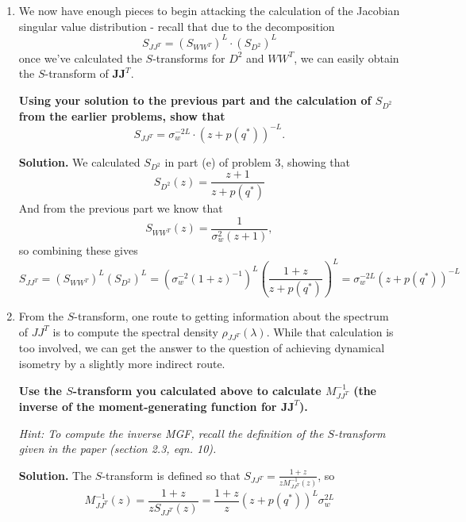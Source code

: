 \documentclass[a4paper]{article}
\begin{document}
\begin{enumerate}[label=(\alph*)]
    \item We now have enough pieces to begin attacking the calculation of the Jacobian singular value distribution - recall that due to the decomposition
    $$ S_{JJ^T} = (S_{WW^T})^L \cdot (S_{D^2})^L $$
    once we've calculated the $S$-transforms for $D^2$ and $WW^T$, we can easily obtain the $S$-transform of $\mathbf{J} \mathbf{J}^T$.
    
    \textbf{Using your solution to the previous part and the calculation of $S_{D^2}$ from the earlier problems, show that}
    $$ S_{JJ^T} = \sigma_w^{-2L} \cdot (z + p(q^*))^{-L} .$$
    
    \begin{tcolorbox}
    \textbf{Solution.}
    We calculated $S_{D^2}$ in part (e) of problem 3, showing that 
    $$S_{D^2}(z) = \frac{z+1}{z+ p(q^*)}$$
    And from the previous part we know that 
    $$S_{WW^T}(z) = \frac{1}{\sigma_w^2(z+1)},$$
    so combining these gives
    $$ S_{JJ^T} = (S_{WW^T})^L (S_{D^2})^L = \left( \sigma_w^{-2} (1 + z)^{-1} \right)^L \left( \frac{1 + z}{z + p(q^*)} \right)^L = \sigma_w^{-2L} (z + p(q^*))^{-L} $$
    \end{tcolorbox}
    
    \item From the $S$-transform, one route to getting information about the spectrum of $JJ^T$ is to compute the spectral density $\rho_{JJ^T}(\lambda)$. While that calculation is too involved, we can get the answer to the question of achieving dynamical isometry by a slightly more indirect route.  
    
    \textbf{Use the $S$-transform you calculated above to calculate $M_{JJ^T}^{-1}$ (the inverse of the moment-generating function for $ \mathbf{J} \mathbf{J}^T$).}
   
    \textit{Hint: To compute the inverse MGF, recall the definition of the $S$-transform given in the paper (section 2.3, eqn. 10).}
 
     \begin{tcolorbox}
     \textbf{Solution.} The $S$-transform is defined so that $ S_{JJ^T} = \frac{1 + z}{z M^{-1}_{JJ^T}(z)}$, so
    $$ M^{-1}_{JJ^T}(z) = \frac{1 + z}{z S_{JJ^T}(z)} = \frac{1 + z}{z} \left(z + p(q^*)\right)^L \sigma_w^{2L} $$
    \end{tcolorbox}   
 

\end{enumerate}
\end{document}
